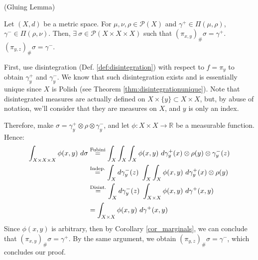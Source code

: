 \begin{lemma} (Gluing Lemma)

  Let $(X,d)$ be a metric space. For $\mu,\nu,\rho \in \mathcal P(X)$ and
  $\gamma^+ \in \Pi(\mu,\rho)$, $\gamma^- \in \Pi(\rho,\nu)$. Then,
  $\exists \ \sigma \in \mathcal P(X \times X \times X)$ such that
  $(\pi_{x,y})_\# \sigma  = \gamma^+$.
  $(\pi_{y,z})_\# \sigma  = \gamma^-$.
  \label{lem:gluing}
\end{lemma}
\begin{prf}
  First, use disintegration (Def. \ref{def:disintegration}) with respect to $f = \pi_y$ to obtain $\gamma^+_y$ and $\gamma^-_y$.
  We know that such
  disintegration exists and is essentially unique since $X$ is Polish (see Theorem \ref{thm:disintegrationunique}).
  Note that disintegrated measures are actually
  defined on $X \times \{y\} \subset X \times X$, but, by abuse of notation, we'll consider that they
  are measures on $X$, and $y$ is only an index.

  Therefore, make $\sigma = \gamma_y^+ \otimes \rho \otimes \gamma_y^-$, and let $\phi:X \times X \to \mathbb R$
  be a measurable function.
  Hence:
  \begin{align*}
    \int_{X \times X \times X} \phi(x,y) \ d\sigma & \overset{\text{Fubini}}{=}
    \int_X \int_X \int_X \phi(x,y) \
    d\gamma_y^+(x) \otimes \rho(y) \otimes \gamma_y^-(z)                                        \\
                                                                  & \overset{\text{Indep.}}{=}
    \int_X d\gamma_y^-(z) \ \int_X \int_X \phi(x,y) \
    d\gamma_y^+(x) \otimes \rho(y)                                                              \\
                                                                  & \overset{\text{Disint.}}{=}
    \int_X d\gamma_y^-(z) \ \int_{X \times X} \phi(x,y) \
    d\gamma^+(x,y)                                                                              \\
                                                                  & \overset{\text{\hfill}}{=}
    \int_{X\times X} \phi(x,y) \
    d\gamma^+(x,y)
  \end{align*}
  Since $\phi(x,y)$ is arbitrary, then by Corollary \ref{cor_marginals}, we can conclude that
  $(\pi_{x,y})_\# \sigma  = \gamma^+$. By the same argument, we obtain
  $(\pi_{y,z})_\# \sigma  = \gamma^-$, which concludes our proof.

\end{prf}

